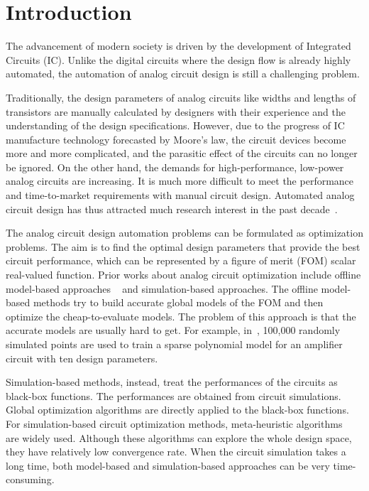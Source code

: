 \section{Introduction}

%
The advancement of modern society is driven by the development of Integrated
Circuits (IC). Unlike the digital circuits where the design flow is already
highly automated, the automation of analog circuit design is still a
challenging problem.

Traditionally, the design parameters of analog circuits like widths and lengths of
transistors are manually calculated by designers with their experience and the
understanding of the design specifications. However, due to the progress of IC
manufacture technology forecasted by Moore's law, the circuit devices become
more and more complicated, and the parasitic effect of the circuits can no
longer be ignored. On the other hand, the demands for high-performance,
low-power analog circuits are increasing. It is much more difficult to
meet the performance and time-to-market requirements with manual circuit design.
Automated analog circuit design has thus attracted much research interest in
the past decade~\cite{rutenbar2007hierarchical}.

The analog circuit design automation problems can be formulated as optimization
problems. The aim is to find the optimal design parameters that provide
the best circuit performance, which can be represented by a figure of merit (FOM)
scalar real-valued function. Prior works about analog circuit optimization include offline
model-based approaches
~\cite{colleran2003optimization,daems2003simulation,wang2014enabling} and
simulation-based approaches. The offline model-based methods try to build
accurate global models of the FOM and then optimize the cheap-to-evaluate models. The
problem of this approach is that the accurate models are usually hard to get.
For example, in~\cite{wang2014enabling}, 100,000 randomly simulated points are
used to train a sparse polynomial model for an amplifier circuit with ten
design parameters.

Simulation-based methods, instead, treat the performances of the circuits as black-box functions. The performances are obtained from circuit simulations. Global optimization
algorithms are directly applied to the black-box functions. For
simulation-based circuit optimization methods, meta-heuristic
algorithms~\cite{phelps2000anaconda, liu2009analog} are widely used. Although
these algorithms can explore the whole design space, they have relatively low
convergence rate. When the circuit simulation takes a long time, both
model-based and simulation-based approaches can be very time-consuming.

